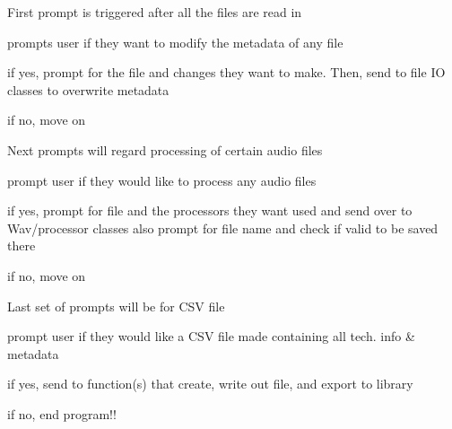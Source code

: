 \begin{DoxyEnumerate}
\item First prompt is triggered after all the files are read in
\begin{DoxyItemize}
\item prompts user if they want to modify the metadata of any file
\begin{DoxyItemize}
\item if yes, prompt for the file and changes they want to make. Then, send to file IO classes to overwrite metadata
\item if no, move on
\end{DoxyItemize}
\end{DoxyItemize}
\item Next prompts will regard processing of certain audio files
\begin{DoxyItemize}
\item prompt user if they would like to process any audio files
\begin{DoxyItemize}
\item if yes, prompt for file and the processors they want used and send over to Wav/processor classes also prompt for file name and check if valid to be saved there
\item if no, move on
\end{DoxyItemize}
\end{DoxyItemize}
\item Last set of prompts will be for CSV file
\begin{DoxyItemize}
\item prompt user if they would like a CSV file made containing all tech. info \& metadata
\begin{DoxyItemize}
\item if yes, send to function(s) that create, write out file, and export to library
\item if no, end program!!
\end{DoxyItemize}
\end{DoxyItemize}
\end{DoxyEnumerate}

